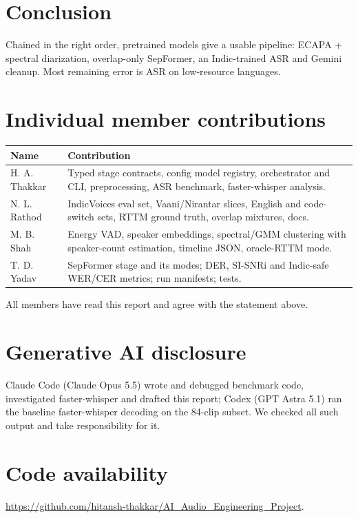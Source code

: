 \documentclass[11pt,a4paper,twocolumn]{article}
\newcommand{\githuburl}{https://github.com/hitansh-thakkar/AI_Audio_Engineering_Project}
\begin{document}
\section{Conclusion}
Chained in the right order, pretrained models give a usable pipeline: ECAPA + spectral
diarization, overlap-only SepFormer, an Indic-trained ASR and Gemini cleanup. Most remaining
error is ASR on low-resource languages.

\section*{Individual member contributions}
{\small
\begin{tabularx}{\linewidth}{@{}l >{\raggedright\arraybackslash}X@{}}
\toprule
Name & Contribution \\
\midrule
H. A. Thakkar & Typed stage contracts, config model registry, orchestrator and CLI, preprocessing, ASR benchmark, faster-whisper analysis. \\
N. L. Rathod & IndicVoices eval set, Vaani/Nirantar slices, English and code-switch sets, RTTM ground truth, overlap mixtures, docs. \\
M. B. Shah & Energy VAD, speaker embeddings, spectral/GMM clustering with speaker-count estimation, timeline JSON, oracle-RTTM mode. \\
T. D. Yadav & SepFormer stage and its modes; DER, SI-SNRi and Indic-safe WER/CER metrics; run manifests; tests. \\
\bottomrule
\end{tabularx}}

\smallskip
\noindent All members have read this report and agree with the statement above.

\section*{Generative AI disclosure}
Claude Code (Claude Opus 5.5) wrote and debugged benchmark code, investigated faster-whisper and
drafted this report; Codex (GPT Astra 5.1) ran the baseline faster-whisper decoding on the
84-clip subset. We checked all such output and take responsibility for it.

\section*{Code availability}
\noindent \url{\githuburl}.
\end{document}
